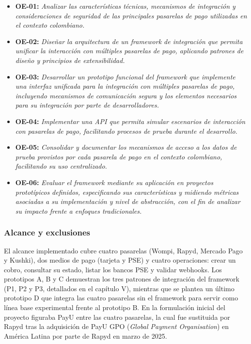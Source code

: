 \begin{itemize}
    \item \textbf{OE-01:} \textit{Analizar las características técnicas, mecanismos de integración y consideraciones de seguridad de las principales pasarelas de pago utilizadas en el contexto colombiano.}
    \item \textbf{OE-02:} \textit{Diseñar la arquitectura de un framework de integración que permita unificar la interacción con múltiples pasarelas de pago, aplicando patrones de diseño y principios de extensibilidad.}
    \item \textbf{OE-03:} \textit{Desarrollar un prototipo funcional del framework que implemente una interfaz unificada para la integración con múltiples pasarelas de pago, incluyendo mecanismos de comunicación segura y los elementos necesarios para su integración por parte de desarrolladores.}
    \item \textbf{OE-04:} \textit{Implementar una API que permita simular escenarios de interacción con pasarelas de pago, facilitando procesos de prueba durante el desarrollo.} 
    \item \textbf{OE-05:} \textit{Consolidar y documentar los mecanismos de acceso a los datos de prueba provistos por cada pasarela de pago en el contexto colombiano, facilitando su uso centralizado.}
    \item \textbf{OE-06:} \textit{Evaluar el framework mediante su aplicación en proyectos prototípicos definidos, especificando sus características y midiendo métricas asociadas a su implementación y nivel de abstracción, con el fin de analizar su impacto frente a enfoques tradicionales.}
\end{itemize}

\subsubsection{Alcance y exclusiones}
El alcance implementado cubre cuatro pasarelas (Wompi, Rapyd, Mercado Pago y Kushki), dos medios de pago (tarjeta y PSE) y cuatro operaciones: crear un cobro, consultar su estado, listar los bancos PSE y validar webhooks. Los prototipos A, B y C demuestran los tres patrones de integración del framework (P1, P2 y P3, detallados en el capítulo V), mientras que se plantea un último prototipo D que integra las cuatro pasarelas sin el framework para servir como línea base experimental frente al prototipo B. En la formulación inicial del proyecto figuraba PayU entre las cuatro pasarelas, la cual fue sustituida por Rapyd tras la adquisición de PayU GPO (\textit{Global Payment Organisation}) en América Latina por parte de Rapyd en marzo de 2025.

